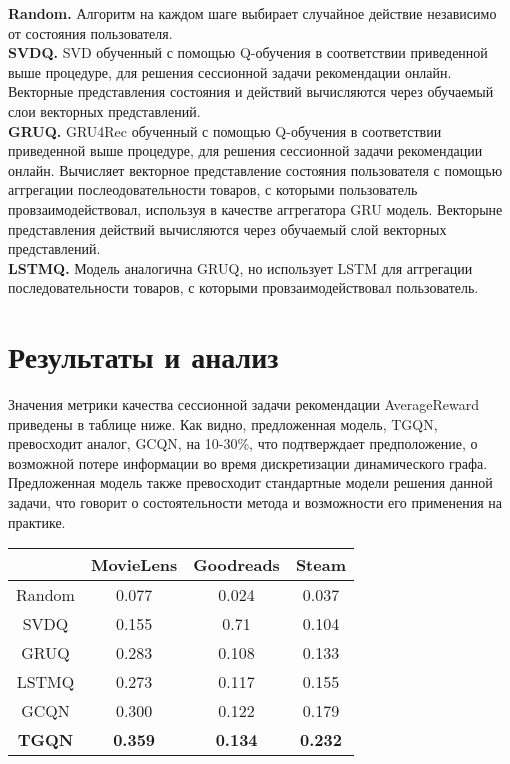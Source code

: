 \documentclass{mipt-thesis-ms}
\begin{document}
{\bf Random.} Алгоритм на каждом шаге выбирает случайное действие независимо от состояния пользователя.\\

{\bf SVDQ.} SVD обученный с помощью Q-обучения в соответствии приведенной выше процедуре, для решения сессионной задачи рекомендации онлайн. Векторные представления состояния и действий вычисляются через обучаемый слои векторных представлений.\\

{\bf GRUQ.} GRU4Rec обученный с помощью Q-обучения в соответствии приведенной выше процедуре, для решения сессионной задачи рекомендации онлайн. Вычисляет векторное представление состояния пользователя с помощью аггрегации послеодовательности товаров, с которыми пользователь провзаимодействовал, используя в качестве аггрегатора GRU модель. Векторыне представления действий вычисляются через обучаемый слой векторных представлений.\\

{\bf LSTMQ.} Модель аналогична GRUQ, но использует LSTM для аггрегации последовательности товаров, с которыми провзаимодействовал пользователь.\\


\section{Результаты и анализ}
Значения метрики качества сессионной задачи рекомендации AverageReward приведены в таблице ниже. Как видно, предложенная
модель, TGQN, превосходит аналог, GCQN, на 10-30\%, что подтверждает предположение, о возможной потере информации во время дискретизации динамического графа. Предложенная модель также превосходит стандартные модели решения данной задачи, что говорит о состоятельности метода и возможности его применения на практике.\\


\begin{table}[!b]
\begin{tabular}{|c|c|c|c|}
\hline
              & MovieLens      & Goodreads      & Steam          \\ \hline
Random        & 0.077          & 0.024          & 0.037          \\ \hline
SVDQ          & 0.155          & 0.71           & 0.104          \\ \hline
GRUQ          & 0.283          & 0.108          & 0.133          \\ \hline
LSTMQ         & 0.273          & 0.117          & 0.155          \\ \hline
GCQN          & 0.300          & 0.122          & 0.179          \\ \hline
\textbf{TGQN} & \textbf{0.359} & \textbf{0.134} & \textbf{0.232} \\ \hline
\end{tabular}
\end{table}
\end{document}
